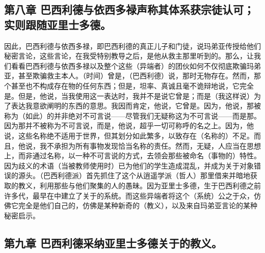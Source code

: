 
\subsection{第八章 巴西利德与依西多禄声称其体系获宗徒认可；实则跟随亚里士多德。}

因此，巴西利德与依西多禄，即巴西利德的真正儿子和门徒，说玛弟亚传授给他们秘密言论，这些言论，在我受特别教导之后，是他从救主那里听到的。那么，让我们看看巴西利德与依西多禄以及整个这些（异端者）的团伙如何不仅彻底欺骗玛弟亚，甚至欺骗救主本人。（时间）曾是，（巴西利德）说，那时无物存在。然而，那个甚至也不构成存在物的任何东西；但是，坦率、真诚且毫不诡辩地说，它完全是。但是，他说，当我使用这一表达时，我并不是说它曾是；而是（我这样说）为了表达我意欲阐明的东西的意思。我因而肯定，他说，它曾是。因为，他说，那被称为（如此）的并非绝对不可言说——尽管我们无疑称这为不可言说——而是那。因为那并不被称为不可言说，而是，他说，超乎一切可称呼的名之上。因为，他说，这些名称绝不适用于世界，但其划分如此繁多，以致存在（名称的）不足。而且，他说，我不承担为所有事物发现恰当名称的责任。然而，无疑，人应当在思想上，而非通过名称，以一种不可言说的方式，去领会那些被命名（事物的）特性。因为歧义的术语（当被教师使用时）已为他们的学生造成混乱，并成为关于对象错误的源头。（巴西利德派）首先抓住了这个从逍遥学派（哲人）那里借来并暗地获取的教义，利用那些与他们聚集的人的愚昧。因为亚里士多德，生于巴西利德之前许多代，最早在中建立了关于的系统。而这些异端者将这个（系统）公之于众，仿佛它完全是他们自己的，仿佛是某种新奇的（教义），以及来自玛弟亚言论的某种秘密启示。\par


\subsection{第九章 巴西利德采纳亚里士多德关于的教义。}

